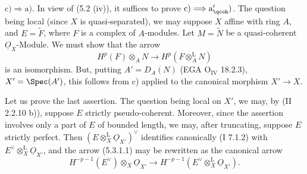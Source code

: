 \(\mathrm c)\Longrightarrow\mathrm a)\). In view of (5.2 (iv)), it suffices to prove \(\mathrm c)\Longrightarrow\mathrm a'_{\qcoh})\). The question being local (since \(X\) is quasi-separated), we may suppose \(X\) affine with ring \(A\), and \(E=\widetilde F\), where \(F\) is a complex of \(A\)-modules. Let \(M=\widetilde N\) be a quasi-coherent \(\underline{O}_X\)-Module. We must show that the arrow
\[
 H^p(F)\otimes_A N\longrightarrow H^p(F\otimes_A^{\mathrm L}N)
\]
is an isomorphism. But, putting \(A'=D_A(N)\) (EGA \(\mathrm O_{\mathrm{IV}}\) 18.2.3), \(X'=\Spec(A')\), this follows from c) applied to the canonical morphism \(X'\to X\).

Let us prove the last assertion. The question being local on \(X'\), we may, by (II 2.2.10 b)), suppose \(E\) strictly pseudo-coherent. Moreover, since the assertion involves only a part of \(E\) of bounded length, we may, after truncating, suppose \(E\) strictly perfect. Then \((E\otimes_X^{\mathrm L}\underline{O}_{X'})^{\vee}\) identifies canonically (I 7.1.2) with \(E^{\vee}\otimes_X^{\mathrm L}\underline{O}_{X'}\), and the arrow (5.3.1.1) may be rewritten as the canonical arrow
\begin{equation}
 H^{-p-1}(E^{\vee})\otimes_X\underline{O}_{X'}\longrightarrow H^{-p-1}(E^{\vee}\otimes_X^{\mathrm L}\underline{O}_{X'}).\tag{$*$}
\end{equation}
